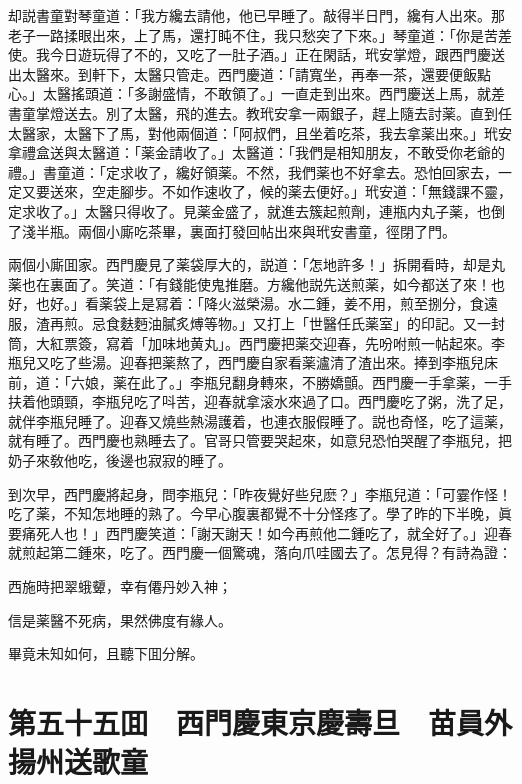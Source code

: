 却説書童對琴童道：「我方纔去請他，他已早睡了。敲得半日門，纔有人出來。那老子一路揉眼出來，上了馬，還打盹不住，我只愁突了下來。」琴童道：「你是苦差使。我今日遊玩得了不的，又吃了一肚子酒。」正在閑話，玳安掌燈，跟西門慶送出太醫來。到軒下，太醫只管走。西門慶道：「請寬坐，再奉一茶，還要便飯點心。」太醫搖頭道：「多謝盛情，不敢領了。」一直走到出來。西門慶送上馬，就差書童掌燈送去。別了太醫，飛的進去。教玳安拿一兩銀子，趕上隨去討薬。直到任太醫家，太醫下了馬，對他兩個道：「阿叔們，且坐着吃茶，我去拿薬出來。」玳安拿禮盒送與太醫道：「薬金請收了。」太醫道：「我們是相知朋友，不敢受你老爺的禮。」書童道：「定求收了，纔好領薬。不然，我們薬也不好拿去。恐怕回家去，一定又要送來，空走腳步。不如作速收了，候的薬去便好。」玳安道：「無錢課不靈，定求收了。」太醫只得收了。見薬金盛了，就進去簇起煎劑，連瓶内丸子薬，也倒了淺半瓶。兩個小廝吃茶畢，裏面打發回帖出來與玳安書童，徑閉了門。

兩個小廝囬家。西門慶見了薬袋厚大的，説道：「怎地許多！」拆開看時，却是丸薬也在裏面了。笑道：「有錢能使鬼推磨。方纔他説先送煎薬，如今都送了來！也好，也好。」看薬袋上是冩着：「降火滋榮湯。水二鍾，姜不用，煎至捌分，食遠服，渣再煎。忌食麩麪油膩炙煿等物。」又打上「世醫任氏薬室」的印記。又一封筒，大紅票簽，寫着「加味地黄丸」。西門慶把薬交迎春，先吩咐煎一帖起來。李瓶兒又吃了些湯。迎春把薬熬了，西門慶自家看薬瀘清了渣出來。捧到李瓶兒床前，道：「六娘，薬在此了。」李瓶兒翻身轉來，不勝嬌顫。西門慶一手拿薬，一手扶着他頭頸，李瓶兒吃了呌苦，迎春就拿滚水來過了口。西門慶吃了粥，洗了足，就伴李瓶兒睡了。迎春又燒些熱湯護着，也連衣服假睡了。説也奇怪，吃了這薬，就有睡了。西門慶也熟睡去了。官哥只管要哭起來，如意兒恐怕哭醒了李瓶兒，把奶子來敎他吃，後邊也寂寂的睡了。

到次早，西門慶將起身，問李瓶兒：「昨夜覺好些兒麽？」李瓶兒道：「可霎作怪！吃了薬，不知怎地睡的熟了。今早心腹裏都覺不十分怪疼了。學了昨的下半晚，眞要痛死人也！」西門慶笑道：「謝天謝天！如今再煎他二鍾吃了，就全好了。」迎春就煎起第二鍾來，吃了。西門慶一個驚魂，落向爪哇國去了。怎見得？有詩為證：

西施時把翠蛾顰，幸有僊丹妙入神；

信是薬醫不死病，果然佛度有緣人。

畢竟未知如何，且聽下囬分解。

\chapter*{第五十五囬　西門慶東京慶壽旦　苗員外揚州送歌童}

